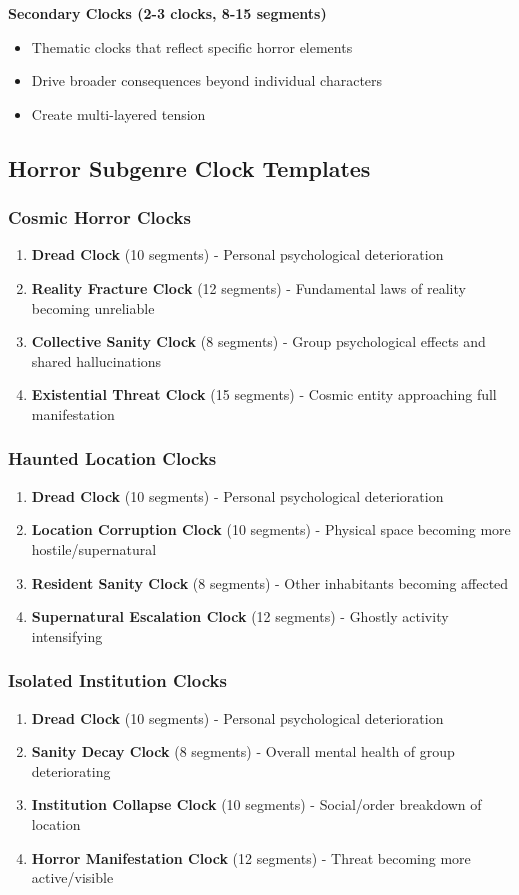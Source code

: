 \documentclass[11pt]{article}
\begin{document}
\textbf{Secondary Clocks (2-3 clocks, 8-15 segments)}
\begin{itemize}
\item Thematic clocks that reflect specific horror elements
\item Drive broader consequences beyond individual characters
\item Create multi-layered tension
\end{itemize}

\subsection{Horror Subgenre Clock Templates}

\subsubsection{Cosmic Horror Clocks}
\begin{enumerate}
\item \textbf{Dread Clock} (10 segments) - Personal psychological deterioration
\item \textbf{Reality Fracture Clock} (12 segments) - Fundamental laws of reality becoming unreliable
\item \textbf{Collective Sanity Clock} (8 segments) - Group psychological effects and shared hallucinations
\item \textbf{Existential Threat Clock} (15 segments) - Cosmic entity approaching full manifestation
\end{enumerate}

\subsubsection{Haunted Location Clocks}
\begin{enumerate}
\item \textbf{Dread Clock} (10 segments) - Personal psychological deterioration
\item \textbf{Location Corruption Clock} (10 segments) - Physical space becoming more hostile/supernatural
\item \textbf{Resident Sanity Clock} (8 segments) - Other inhabitants becoming affected
\item \textbf{Supernatural Escalation Clock} (12 segments) - Ghostly activity intensifying
\end{enumerate}

\subsubsection{Isolated Institution Clocks}
\begin{enumerate}
\item \textbf{Dread Clock} (10 segments) - Personal psychological deterioration
\item \textbf{Sanity Decay Clock} (8 segments) - Overall mental health of group deteriorating
\item \textbf{Institution Collapse Clock} (10 segments) - Social/order breakdown of location
\item \textbf{Horror Manifestation Clock} (12 segments) - Threat becoming more active/visible
\end{enumerate}
\end{document}
